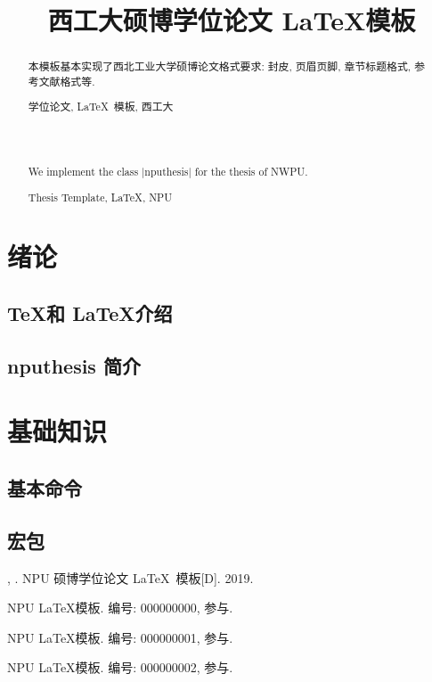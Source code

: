\documentclass[twoside, UTF8, phd, AutoFakeBold]{nputhesis}
\title[\LaTeX\ Template of NPU Thesis]{西工大硕博学位论文 \LaTeX 模板}
\author[\dbr{San Zhang}]{\dbr{张三}}
\begin{document}
\makecover
\frontmatter

\begin{abstract}
  本模板基本实现了西北工业大学硕博论文格式要求: 封皮, 页眉页脚,
  章节标题格式, 参考文献格式等.
  \begin{keywords}
    学位论文, \LaTeX\ 模板, 西工大
  \end{keywords}
\end{abstract}
\begin{Abstract}
  We implement the class |nputhesis| for the thesis of NWPU.
  \begin{Keywords}
    Thesis Template, \LaTeX, NPU
  \end{Keywords}
\end{Abstract}

\tableofcontents
\printnomenclature

\mainmatter

\chapter{绪论}
\section{\TeX 和 \LaTeX 介绍}
\section{nputhesis 简介}
\chapter{基础知识}
\section{基本命令}
\section{宏包}

\backmatter

\printbibliography             %

\Thanks     %

\Work
\papersection  %

\begin{npulist}
  \item {\bf {}}, . NPU 硕博学位论文
    \LaTeX\ 模板[D]. 2019.
\end{npulist}

\researchsection %
\begin{npulist}
  \item NPU \LaTeX 模板.   编号: 000000000, 参与.
  \item NPU \LaTeX 模板.   编号: 000000001, 参与.
  \item NPU \LaTeX 模板.   编号: 000000002, 参与.
\end{npulist}
\statement
\end{document}
